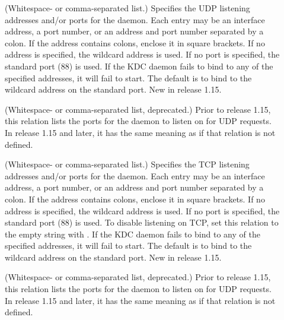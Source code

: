 \documentclass[letterpaper,10pt,english]{sphinxmanual}
\begin{document}
\begin{description}
\item[{}] \leavevmode
(Whitespace- or comma-separated list.)  Specifies the UDP
listening addresses and/or ports for the {\hyperref[\detokenize{admin/admin_commands/krb5kdc:krb5kdc-8}]{}} daemon.
Each entry may be an interface address, a port number, or an
address and port number separated by a colon.  If the address
contains colons, enclose it in square brackets.  If no address is
specified, the wildcard address is used.  If no port is specified,
the standard port (88) is used.  If the KDC daemon fails to bind
to any of the specified addresses, it will fail to start.  The
default is to bind to the wildcard address on the standard port.
New in release 1.15.

\item[{}] \leavevmode
(Whitespace- or comma-separated list, deprecated.)  Prior to
release 1.15, this relation lists the ports for the
{\hyperref[\detokenize{admin/admin_commands/krb5kdc:krb5kdc-8}]{}} daemon to listen on for UDP requests.  In
release 1.15 and later, it has the same meaning as 
if that relation is not defined.

\item[{}] \leavevmode
(Whitespace- or comma-separated list.)  Specifies the TCP
listening addresses and/or ports for the {\hyperref[\detokenize{admin/admin_commands/krb5kdc:krb5kdc-8}]{}} daemon.
Each entry may be an interface address, a port number, or an
address and port number separated by a colon.  If the address
contains colons, enclose it in square brackets.  If no address is
specified, the wildcard address is used.  If no port is specified,
the standard port (88) is used.  To disable listening on TCP, set
this relation to the empty string with .
If the KDC daemon fails to bind to any of the specified addresses,
it will fail to start.  The default is to bind to the wildcard
address on the standard port.  New in release 1.15.

\item[{}] \leavevmode
(Whitespace- or comma-separated list, deprecated.)  Prior to
release 1.15, this relation lists the ports for the
{\hyperref[\detokenize{admin/admin_commands/krb5kdc:krb5kdc-8}]{}} daemon to listen on for UDP requests.  In
release 1.15 and later, it has the same meaning as
 if that relation is not defined.


\end{description}
\end{document}

